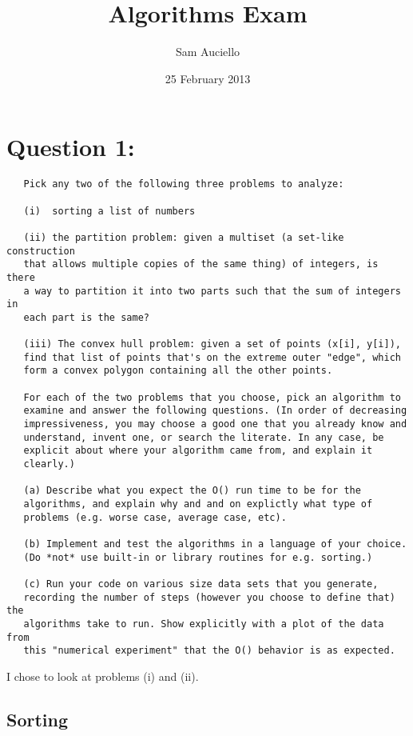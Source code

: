 \documentclass[11pt]{article}
\title{Algorithms Exam}
\author{Sam Auciello}
\date{25 February 2013}
\begin{document}
\maketitle




\section*{Question 1:}
\label{sec-1}

  
\begin{verbatim}
   Pick any two of the following three problems to analyze:
   
   (i)  sorting a list of numbers
   
   (ii) the partition problem: given a multiset (a set-like construction
   that allows multiple copies of the same thing) of integers, is there
   a way to partition it into two parts such that the sum of integers in
   each part is the same?
   
   (iii) The convex hull problem: given a set of points (x[i], y[i]),
   find that list of points that's on the extreme outer "edge", which
   form a convex polygon containing all the other points.
   
   For each of the two problems that you choose, pick an algorithm to
   examine and answer the following questions. (In order of decreasing
   impressiveness, you may choose a good one that you already know and
   understand, invent one, or search the literate. In any case, be
   explicit about where your algorithm came from, and explain it
   clearly.)
   
   (a) Describe what you expect the O() run time to be for the
   algorithms, and explain why and and on explictly what type of
   problems (e.g. worse case, average case, etc).
   
   (b) Implement and test the algorithms in a language of your choice.
   (Do *not* use built-in or library routines for e.g. sorting.)
   
   (c) Run your code on various size data sets that you generate,
   recording the number of steps (however you choose to define that) the
   algorithms take to run. Show explicitly with a plot of the data from
   this "numerical experiment" that the O() behavior is as expected.
\end{verbatim}

  
  \noindent
  I chose to look at problems (i) and (ii).
  
\subsection*{Sorting}
\label{sec-1.1}
\end{document}
